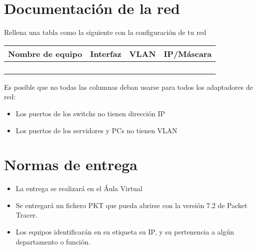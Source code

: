 \section{Documentación de la red}
Rellena una tabla como la siguiente con la configuración de tu red

\begin{center}
  \begin{tabular}{|c|c|c|c|}
    \hline
    Nombre de equipo & Interfaz & VLAN & IP/Máscara \\
    \hline
                     & & & \\
                     & & & \\
                     & & & \\
                     & & & \\
    \hline
  \end{tabular}
\end{center}

Es posible que no todas las columnas deban usarse para todos los adaptadores de red:
\begin{itemize}
\item Los puertos de los switchs no tienen dirección IP
\item Los puertos de los servidores y PCs no tienen VLAN
\end{itemize}

\section{Normas de entrega}
\begin{itemize}
  
\item La entrega se realizará en el Áula Virtual
\item Se entregará un fichero PKT que pueda abrirse con la versión 7.2 de Packet Tracer.
\item Los equipos identificarán en su etiqueta su IP, y su pertenencia a algún departamento o función.
\end{itemize}

